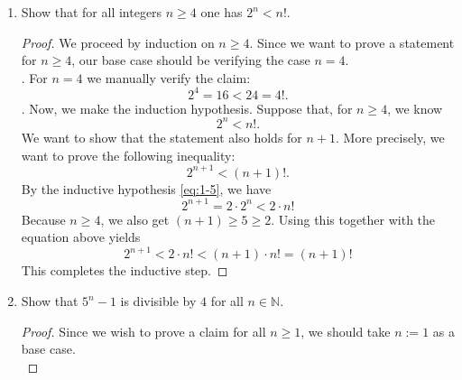 \documentclass[12pt, reqno]{article}
\numberwithin{equation}{section}
\theoremstyle{definition}
\theoremstyle{remark}
\newcommand{\NN}{\mathbb{N}}
\begin{document}
\begin{enumerate}[leftmargin=*]
	      For example, show that for all $n\in \NN$, it holds that
	      \[
		      \sum_{k=1}^n k := 1+2+\dots + n = \frac{n(n+1)}{2}
	      \]
	      \begin{proof}
		      So, clearly the statement holds for $n=1$;
		      \[
			      1 = \frac{1(2)}{2} = \frac{1(1+1)}{2}
		      \]
		      This proves the base case. We now do the induction step. Here, we suppose the statement holds for some $n\geq 1$. Then for $n+1$ we have
		      \begin{align*}
			      \sum_{k=1}^{n+1} k & := \underbrace{1+2+\dots + n}_{= n(n+1)/2 \text{ by the induction hypothesis}} + (n+1) \\
			                         & = \frac{n(n+1)}{2} + (n+1)                                                             \\
			                         & = (n+1)\left(\frac{n}{2} + 1\right)                                                    \\
			                         & = (n+1)\left(\frac{n+2}{2}\right)                                                      \\
			                         & =\frac{(n+1)([n+1]+1)}{2}
		      \end{align*}
		      This shows that the statement also holds for $n+1$ which concludes the proof.
	      \end{proof}
	\item Show that for all integers $n \geq 4$ one has $2^n < n!$.

	      \begin{proof}
		      We proceed by induction on $n \geq 4$. Since we want to prove a statement for $n \geq 4$, our base case should be verifying the case $n = 4$.\\

		      \noindent{}. For $n=4$ we manually verify the claim:
		      \[
			      2^4 = 16 < 24 = 4!.
		      \]
		      . Now, we make the induction hypothesis. Suppose that, for $n \geq 4$, we know
		      \begin{equation}\label{eq:1-5}
			      2^n < n!.
		      \end{equation}
		      We want to show that the statement also holds for $n+1$. More precisely, we want to prove the following inequality: \[2^{n+1} < (n+1)!.\] By the inductive hypothesis \eqref{eq:1-5}, we have
		      \[
			      2^{n+1} = 2\cdot 2^n < 2\cdot n!
		      \]
		      Because $n \geq 4$, we also get $(n+1) \geq 5 \geq 2$. Using this together with the equation above yields
		      \[
			      2^{n+1} < 2\cdot n! < (n+1)\cdot n! = (n+1)!
		      \]
		      This completes the inductive step.
	      \end{proof}
	\item Show that $5^n - 1$ is divisible by $4$ for all $n \in \NN$.
	      \begin{proof}
		      Since we wish to prove a claim for all $n \geq 1$, we should take $n := 1$ as a base case. \\


\end{proof}
\end{enumerate}
\end{document}
